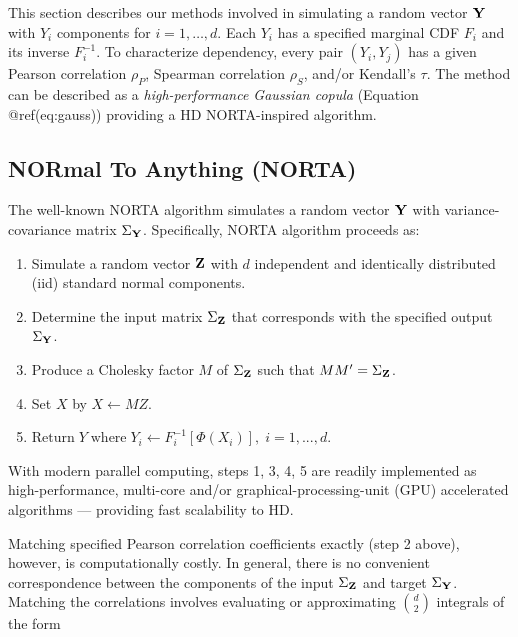 \documentclass[
]{jss}
\providecommand{\tightlist}{%
  \setlength{\itemsep}{0pt}\setlength{\parskip}{0pt}}
\begin{document}
This section describes our methods involved in simulating a random
vector \(\bf Y\) with \(Y_i\) components for \(i=1,\ldots,d\). Each
\(Y_i\) has a specified marginal CDF \(F_i\) and its inverse
\(F^{-1}_i\). To characterize dependency, every pair \((Y_i, Y_j)\) has
a given Pearson correlation \(\rho_P\), Spearman correlation \(\rho_S\),
and/or Kendall's \(\tau\). The method can be described as a
\emph{high-performance Gaussian copula} (Equation @ref(eq:gauss))
providing a HD NORTA-inspired algorithm.

\hypertarget{normal-to-anything-norta}{%
\subsection{NORmal To Anything (NORTA)}\label{normal-to-anything-norta}}

The well-known NORTA algorithm \citep{Cario1997} simulates a random
vector \(\bf Y\) with variance-covariance matrix \(\Sigma_{\bf Y}\).
Specifically, NORTA algorithm proceeds as:


\begin{enumerate}
\def\labelenumi{\arabic{enumi}.}
\tightlist
\item
  Simulate a random vector \(\bf Z\) with \(d\) independent and
  identically distributed (iid) standard normal components.
\item
  Determine the input matrix \(\Sigma_{\bf Z}\) that corresponds with
  the specified output \(\Sigma_{\bf Y}\).
\item
  Produce a Cholesky factor \(M\) of \(\Sigma_{\bf Z}\) such that
  \(M M^{\prime}=\Sigma_{\bf Z}\).
\item
  Set \(X\) by \(X \gets MZ\).
\item
  \(\text{Return} \; Y \; \text{where} \; Y_i \gets F_i^{-1}[\Phi(X_i)], \; i=1,...,d\).
\end{enumerate}


With modern parallel computing, steps 1, 3, 4, 5 are readily implemented
as high-performance, multi-core and/or graphical-processing-unit (GPU)
accelerated algorithms --- providing fast scalability to HD.

Matching specified Pearson correlation coefficients exactly (step 2
above), however, is computationally costly. In general, there is no
convenient correspondence between the components of the input
\(\Sigma_{\bf Z}\) and target \(\Sigma_{\bf Y}\). Matching the
correlations involves evaluating or approximating \(\binom{d}{2}\)
integrals of the form
\end{document}
